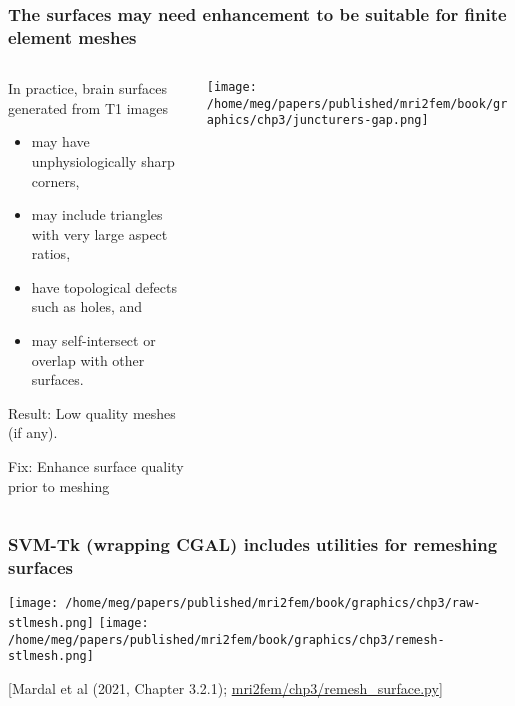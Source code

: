 \documentclass[10pt, mathserif, aspectratio=169, t, usenames, dvipsnames]{beamer}
\newcommand{\refer}[1]{\begin{flushright}{\tiny \textcolor{Cerulean}{[#1]}}\end{flushright}}
\begin{document}
\begin{frame}
\frametitle{The surfaces may need enhancement to be suitable for finite element meshes}

\begin{columns}[T]
\begin{column}{0.6\textwidth}
In practice, brain surfaces generated from T1 images 
\begin{itemize}
\item may have unphysiologically sharp corners,   
\item may include triangles with very large aspect ratios, 
\item have topological defects such as holes, and
\item may self-intersect or overlap with other surfaces.   
\end{itemize}

\medskip

\alert{Result:} Low quality meshes (if any). \\

\medskip

\alert{Fix:} Enhance surface quality prior to meshing
\end{column}
\begin{column}{0.4\textwidth}
  \centering
  \texttt{[image: /home/meg/papers/published/mri2fem/book/graphics/chp3/juncturers-gap.png]}
\end{column}

\end{columns}
\end{frame}


\begin{frame}
  \frametitle{SVM-Tk (wrapping CGAL) includes utilities for remeshing surfaces}
  \centering
  \texttt{[image: /home/meg/papers/published/mri2fem/book/graphics/chp3/raw-stlmesh.png]}
  \texttt{[image: /home/meg/papers/published/mri2fem/book/graphics/chp3/remesh-stlmesh.png]}
  \refer{Mardal et al (2021, Chapter 3.2.1); \href{https://github.com/kent-and/mri2fem/blob/master/mri2fem/mri2fem/chp3/remesh_surface.py}{mri2fem/chp3/remesh\_surface.py}}
\end{frame}
\end{document}
